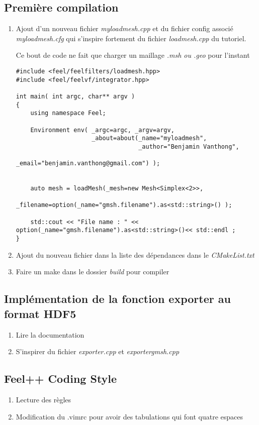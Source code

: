 \documentclass[12pt]{article}
\begin{document}
\subsection {Première compilation}
    \begin{enumerate}
        \item Ajout d'un nouveau fichier \emph{myloadmesh.cpp} et du fichier config associé \emph{myloadmesh.cfg} qui s'inspire fortement du fichier \emph{loadmesh.cpp} du tutoriel.

        Ce bout de code ne fait que charger un maillage \emph{.msh ou .geo} pour l'instant
\newpage
\begin {lstlisting}
#include <feel/feelfilters/loadmesh.hpp>
#include <feel/feelvf/integrator.hpp>

int main( int argc, char** argv )
{
    using namespace Feel;

    Environment env( _argc=argc, _argv=argv,
                     _about=about(_name="myloadmesh",
                                  _author="Benjamin Vanthong",
                                  _email="benjamin.vanthong@gmail.com") );


    auto mesh = loadMesh(_mesh=new Mesh<Simplex<2>>,
                         _filename=option(_name="gmsh.filename").as<std::string>() );
    
    std::cout << "File name : " << option(_name="gmsh.filename").as<std::string>()<< std::endl ;
}
\end{lstlisting}
    \item Ajout du nouveau fichier dans la liste des dépendances dans le \emph{CMakeList.txt}
    \item Faire un make dans le dossier \emph{build} pour compiler
    \end{enumerate}
\subsection {Implémentation de la fonction exporter au format HDF5}
    \begin {enumerate}
    \item Lire la documentation
    \item S'inspirer du fichier \emph{exporter.cpp} et \emph{exportergmsh.cpp}
    \end{enumerate}
\subsection {Feel++ Coding Style}
    \begin{enumerate}
    \item Lecture des règles
    \item Modification du .vimrc pour avoir des tabulations qui font quatre espaces
    \end {enumerate}
\end{document}
